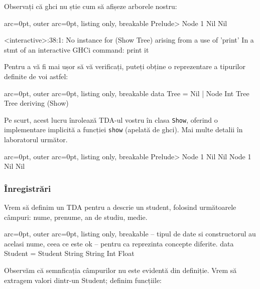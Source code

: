 \begin{tcolorbox}[colback=cyan!5, colframe=cyan!10, breakable]
Observați că ghci nu știe cum să afișeze arborele nostru:


\begin{tcblisting}{ arc=0pt, outer arc=0pt, listing only, breakable}
Prelude> Node 1 Nil Nil

<interactive>:38:1:
    No instance for (Show Tree) arising from a use of 'print'
    In a stmt of an interactive GHCi command: print it

\end{tcblisting}


Pentru a vă fi mai ușor să vă verificați, puteți obține o reprezentare a tipurilor definite de voi astfel:


\begin{tcblisting}{ arc=0pt, outer arc=0pt, listing only, breakable}
data Tree = Nil | Node Int Tree Tree deriving (Show)

\end{tcblisting}


Pe scurt, acest lucru înrolează TDA-ul vostru în clasa \texttt{Show}, oferind o implementare implicită a funcției \texttt{show} (apelată de ghci). Mai multe detalii în laboratorul următor.


\begin{tcblisting}{ arc=0pt, outer arc=0pt, listing only, breakable}
Prelude> Node 1 Nil Nil
Node 1 Nil Nil

\end{tcblisting}

\end{tcolorbox}


\subsubsection*{ Înregistrări }

Vrem să definim un TDA pentru a descrie un student, folosind următoarele câmpuri: nume, prenume, an de studiu, medie.


\begin{tcblisting}{ arc=0pt, outer arc=0pt, listing only, breakable}
-- tipul de date si constructorul au acelasi nume, ceea ce este ok
-- pentru ca reprezinta concepte diferite.
data Student = Student String String Int Float

\end{tcblisting}


Observăm că semnficația câmpurilor nu este evidentă din definiție. Vrem să extragem valori dintr-un Student; definim funcțiile:


